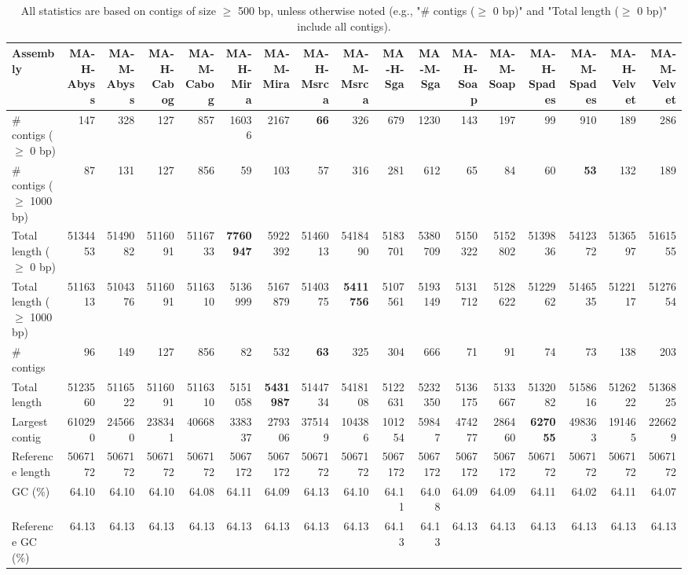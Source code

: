 \documentclass[12pt,a4paper]{article}
\begin{document}
\begin{table}[ht]
\begin{center}
\caption{All statistics are based on contigs of size $\geq$ 500 bp, unless otherwise noted (e.g., "\# contigs ($\geq$ 0 bp)" and "Total length ($\geq$ 0 bp)" include all contigs).}
\begin{tabular}{|l*{16}{|r}|}
\hline
Assembly & MA-H-Abyss & MA-M-Abyss & MA-H-Cabog & MA-M-Cabog & MA-H-Mira & MA-M-Mira & MA-H-Msrca & MA-M-Msrca & MA-H-Sga & MA-M-Sga & MA-H-Soap & MA-M-Soap & MA-H-Spades & MA-M-Spades & MA-H-Velvet & MA-M-Velvet \\ \hline
\# contigs ($\geq$ 0 bp) & 147 & 328 & 127 & 857 & 16036 & 2167 & {\bf 66} & 326 & 679 & 1230 & 143 & 197 & 99 & 910 & 189 & 286 \\ \hline
\# contigs ($\geq$ 1000 bp) & 87 & 131 & 127 & 856 & 59 & 103 & 57 & 316 & 281 & 612 & 65 & 84 & 60 & {\bf 53} & 132 & 189 \\ \hline
Total length ($\geq$ 0 bp) & 5134453 & 5149082 & 5116091 & 5116733 & {\bf 7760947} & 5922392 & 5146013 & 5418490 & 5183701 & 5380709 & 5150322 & 5152802 & 5139836 & 5412372 & 5136597 & 5161555 \\ \hline
Total length ($\geq$ 1000 bp) & 5116313 & 5104376 & 5116091 & 5116310 & 5136999 & 5167879 & 5140375 & {\bf 5411756} & 5107561 & 5193149 & 5131712 & 5128622 & 5122962 & 5146535 & 5122117 & 5127654 \\ \hline
\# contigs & 96 & 149 & 127 & 856 & 82 & 532 & {\bf 63} & 325 & 304 & 666 & 71 & 91 & 74 & 73 & 138 & 203 \\ \hline
Total length & 5123560 & 5116522 & 5116091 & 5116310 & 5151058 & {\bf 5431987} & 5144734 & 5418108 & 5122631 & 5232350 & 5136175 & 5133667 & 5132082 & 5158616 & 5126222 & 5136825 \\ \hline
Largest contig & 610290 & 245660 & 238341 & 40668 & 338337 & 279306 & 375149 & 104386 & 101254 & 59847 & 474277 & 286460 & {\bf 627055} & 498363 & 191465 & 226629 \\ \hline
Reference length & 5067172 & 5067172 & 5067172 & 5067172 & 5067172 & 5067172 & 5067172 & 5067172 & 5067172 & 5067172 & 5067172 & 5067172 & 5067172 & 5067172 & 5067172 & 5067172 \\ \hline
GC (\%) & 64.10 & 64.10 & 64.10 & 64.08 & 64.11 & 64.09 & 64.13 & 64.10 & 64.11 & 64.08 & 64.09 & 64.09 & 64.11 & 64.02 & 64.11 & 64.07 \\ \hline
Reference GC (\%) & 64.13 & 64.13 & 64.13 & 64.13 & 64.13 & 64.13 & 64.13 & 64.13 & 64.13 & 64.13 & 64.13 & 64.13 & 64.13 & 64.13 & 64.13 & 64.13 \\ \hline

\end{tabular}
\end{center}
\end{table}
\end{document}
